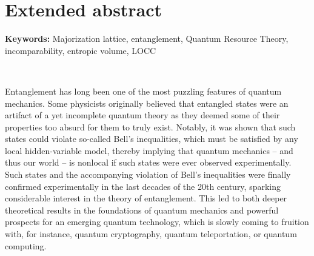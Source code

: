 \section*{Extended abstract}


\textbf{Keywords:} Majorization lattice, entanglement, Quantum Resource Theory, incomparability, entropic volume, LOCC

~

Entanglement has long been one of the most puzzling features of quantum mechanics. Some physicists originally believed that entangled states were an artifact of a yet incomplete quantum theory as they deemed some of their properties too absurd for them to truly exist. Notably, it was shown that such states could violate so-called Bell’s inequalities, which must be satisfied by any local hidden-variable model, thereby implying that quantum mechanics – and thus our world – is nonlocal if such states were ever observed experimentally. Such states and the accompanying violation of Bell’s inequalities were finally confirmed experimentally in the last decades of the 20th century, sparking considerable interest in the theory of entanglement.  This led to both deeper theoretical results in the foundations of quantum mechanics and powerful prospects for an emerging quantum technology, which is slowly coming to fruition with, for instance, quantum cryptography, quantum teleportation, or quantum computing.

